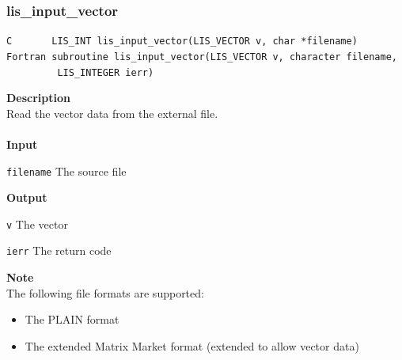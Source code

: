 \documentclass[a4paper]{article}
\newcommand{\namelistlabel}[1]{\mbox{#1}\hfill}
\newenvironment{namelist}[1]{%
\begin{list}{}
  {\let\makelabel\namelistlabel
  \settowidth{\labelwidth}{#1}
  \setlength{\leftmargin}{1.1\labelwidth}}
  }{%
\end{list}}
\begin{document}
\subsubsection{lis\_input\_vector}
\begin{screen}
\verb|C       LIS_INT lis_input_vector(LIS_VECTOR v, char *filename)|\\
\verb|Fortran subroutine lis_input_vector(LIS_VECTOR v, character filename,|\\
\verb|         LIS_INTEGER ierr) |
\end{screen}
{\bf Description}\\
\indent
Read the vector data from the external file.
\\ \\
\noindent
{\bf Input}
\begin{namelist}{XXXXXXXXXXXXXXXXXXXX}
\item[\tt filename] The source file
\end{namelist}
{\bf Output}
\begin{namelist}{XXXXXXXXXXXXXXXXXXXX}
\item[\tt v] The vector
\item[\tt ierr] The return code
\end{namelist}
{\bf Note}\\
\indent
The following file formats are supported:
\begin{itemize}
\item The PLAIN format
\item The extended Matrix Market format (extended to allow vector data)
\end{itemize}
\end{document}
